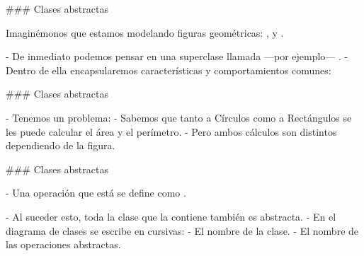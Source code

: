 ### Clases abstractas


Imaginémonos que estamos modelando figuras geométricas: ,  y .

- De inmediato podemos pensar en una superclase llamada ---por ejemplo--- .
    - Dentro de ella encapsularemos características y comportamientos comunes:


### Clases abstractas


\vspace{-1.5em}
\columnsbegin
{}

- Tenemos un problema:
    - Sabemos que tanto a Círculos como a Rectángulos se les puede calcular el área y el perímetro.
    - Pero ambos cálculos son distintos dependiendo de la figura.


\columnsend

### Clases abstractas


- Una operación que está  se define como .

- Al suceder esto, toda la clase que la contiene también es abstracta.
    - En el diagrama de clases se escribe en cursivas:
        - El nombre de la clase.
        - El nombre de las operaciones abstractas.

